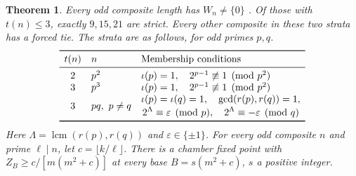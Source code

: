 \documentclass[11pt,reqno]{amsart}
\newtheorem{theorem}{Theorem}
\begin{document}
\begin{theorem}\label{th:composite}
Every odd composite length has \(W_n\ne\{0\}\) \cite[Section~3]{G10}. Of those with \(t(n)\le3\), exactly \(9,15,21\) are strict. Every other composite in these two strata has a forced tie. The strata are as follows, for odd primes \(p,q\).
\[
\begin{array}{cll}
\toprule
t(n)& n & \text{Membership conditions}\\ \midrule
2 & p^2 & \iota(p)=1,\quad 2^{p-1}\not\equiv1\pmod{p^2}\\
3 & p^3 & \iota(p)=1,\quad 2^{p-1}\not\equiv1\pmod{p^2}\\
3 & pq,\ p\ne q &
 \begin{gathered}
 \iota(p)=\iota(q)=1,\quad \gcd(r(p),r(q))=1,\\[-2pt]
 2^{\Lambda}\equiv\varepsilon\pmod p,\quad 2^{\Lambda}\equiv-\varepsilon\pmod q
 \end{gathered}\\
\bottomrule
\end{array}
\]
Here \(\Lambda=\operatorname{lcm}(r(p),r(q))\) and \(\varepsilon\in\{\pm1\}\). For every odd composite \(n\) and prime \(\ell\mid n\), let \(c=\lfloor k/\ell\rfloor\). There is a chamber fixed point with \(Z_B\ge c/[m(m^2+c)]\) at every base \(B=s(m^2+c)\), \(s\) a positive integer.
\end{theorem}
\end{document}

